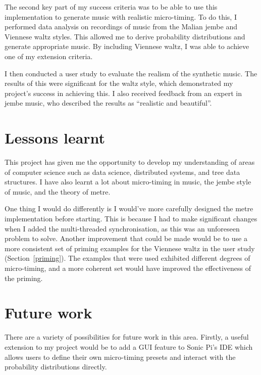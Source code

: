 \documentclass[12pt,twoside,openright]{report}
\begin{document}
The second key part of my success criteria was to be able to use this
implementation to generate music with realistic micro-timing. To do this, I
performed data analysis on recordings of music from the Malian jembe and
Viennese waltz styles. This allowed me to derive probability distributions and
generate appropriate music. By including Viennese waltz, I was able to achieve
one of my extension criteria.

I then conducted a user study to evaluate the realism of the synthetic music.
The results of this were significant for the waltz style, which demonstrated my
project's success in achieving this. I also received feedback from an expert in
jembe music, who described the results as ``realistic and beautiful''.



\section{Lessons learnt} \label{lessons_learnt}

This project has given me the opportunity to develop my understanding of areas
of computer science such as data science, distributed systems, and tree data
structures. I have also learnt a lot about micro-timing in music, the jembe
style of music, and the theory of metre.

One thing I would do differently is I would've more carefully designed the metre
implementation before starting. This is because I had to make significant
changes when I added the multi-threaded synchronisation, as this was an
unforeseen problem to solve. Another improvement that could be made would be to
use a more consistent set of priming examples for the Viennese waltz in the user
study (Section~\ref{priming}). The examples that were used exhibited different degrees of
micro-timing, and a more coherent set would have improved the effectiveness of
the priming.



\section{Future work} \label{future_work}

There are a variety of possibilities for future work in this area. Firstly, a
useful extension to my project would be to add a GUI feature to Sonic Pi's IDE
which allows users to define their own micro-timing presets and interact with
the probability distributions directly.
\end{document}
